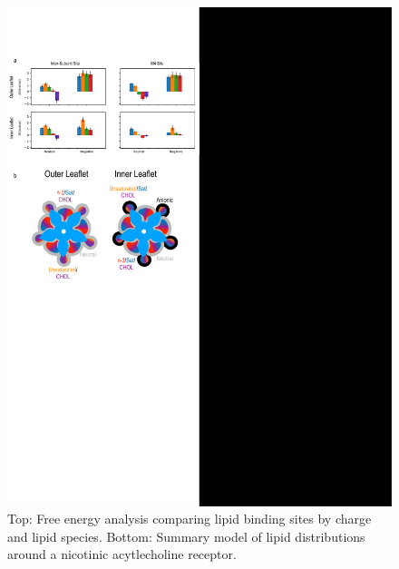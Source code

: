 \documentclass[oneside]{report}
\begin{document}
\begin{figure}[h]
\begin{center}
\includegraphics [width=\linewidth]{Caliburn_Udate.pdf}
\end{center}
\label{fig:update}
\caption{ Top: Free energy analysis comparing lipid binding sites by charge and lipid species. Bottom: Summary model of lipid distributions around a nicotinic acytlecholine receptor.}
\end{figure}
\clearpage
\end{document}
